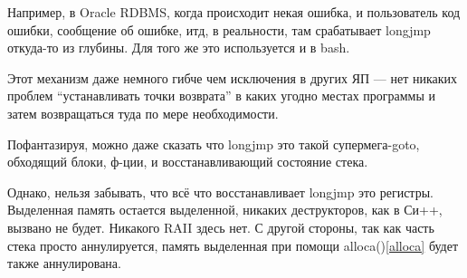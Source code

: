 Например, в Oracle RDBMS, когда происходит некая ошибка, и пользователь код ошибки, сообщение об ошибке, итд,
в реальности, там срабатывает longjmp откуда-то из глубины. Для того же это используется и в bash.

Этот механизм даже немного гибче чем исключения в других ЯП --- нет никаких проблем ``устанавливать точки 
возврата'' в каких угодно местах программы и затем возвращаться туда по мере необходимости.

\label{goto}
Пофантазируя, можно даже сказать что longjmp это такой супермега-goto, обходящий блоки, ф-ции, и восстанавливающий
состояние стека.

Однако, нельзя забывать, что всё что восстанавливает longjmp это регистры. Выделенная память остается выделенной,
никаких деструкторов, как в Си++, вызвано не будет. Никакого \ac{RAII} здесь нет. 
С другой стороны, так как часть стека просто аннулируется, 
память выделенная при помощи alloca()\ref{alloca} будет также аннулирована.

